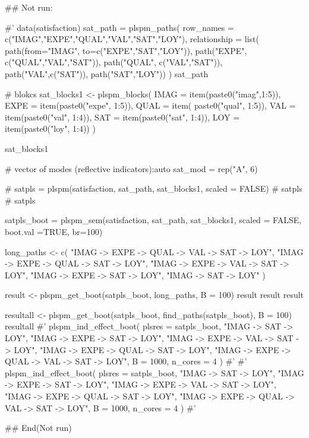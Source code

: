 \documentclass[a4paper]{book}
\begin{document}
\begin{Examples}
\begin{ExampleCode}

\#\# Not run: 

#'
data(satisfaction)
sat_path = plspm_paths(
  row_names = c("IMAG","EXPE","QUAL","VAL","SAT","LOY"),
  relationship = list(
    path(from="IMAG", to=c("EXPE","SAT","LOY")),
    path("EXPE", c("QUAL","VAL","SAT")),
    path("QUAL", c("VAL","SAT")),
    path("VAL",c("SAT")),
    path("SAT","LOY"))
)
sat_path

# blokcs
sat_blocks1 <- plspm_blocks(
  IMAG = item(paste0("imag",1:5)),
  EXPE = item(paste0("expe", 1:5)),
  QUAL = item( paste0("qual", 1:5)),
  VAL = item(paste0("val", 1:4)),
  SAT = item(paste0("sat", 1:4)),
  LOY = item(paste0("loy", 1:4))
)

sat_blocks1

# vector of modes (reflective indicators):auto
sat_mod = rep("A", 6)

# satpls = plspm(satisfaction, sat_path, sat_blocks1, scaled = FALSE)
# satpls
# satpls %

satpls_boot = plspm_sem(satisfaction, sat_path, sat_blocks1, scaled = FALSE,
                        boot.val =TRUE, br=100)


long_paths <- c(
  "IMAG -> EXPE -> QUAL -> VAL -> SAT -> LOY",
  "IMAG -> EXPE -> QUAL -> SAT -> LOY",
  "IMAG -> EXPE -> VAL -> SAT -> LOY",
  "IMAG -> EXPE -> SAT -> LOY",
  "IMAG -> SAT -> LOY"
)

result <- plspm_get_boot(satpls_boot, long_paths, B = 100)
result
result %
result %

resultall <- plspm_get_boot(satpls_boot, find_paths(satpls_boot), B = 100)
resultall
#'
plspm_ind_effect_boot(
  plsres = satpls_boot,
  "IMAG -> SAT -> LOY",
  "IMAG -> EXPE -> SAT -> LOY",
  "IMAG -> EXPE -> VAL -> SAT -> LOY",
  "IMAG -> EXPE -> QUAL -> SAT -> LOY",
  "IMAG -> EXPE -> QUAL -> VAL -> SAT -> LOY",
  B = 1000,
  n_cores = 4
)%
#'
#'
plspm_ind_effect_boot(
  plsres = satpls_boot,
  "IMAG -> SAT -> LOY",
  "IMAG -> EXPE -> SAT -> LOY",
  "IMAG -> EXPE -> VAL -> SAT -> LOY",
  "IMAG -> EXPE -> QUAL -> SAT -> LOY",
  "IMAG -> EXPE -> QUAL -> VAL -> SAT -> LOY",
  B = 1000,
  n_cores = 4
)
#'



## End(Not run)




\end{ExampleCode}
\end{Examples}
\end{document}
